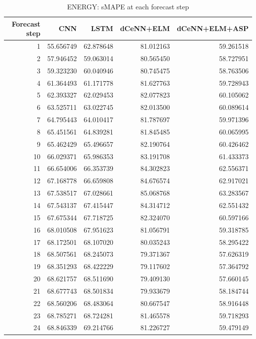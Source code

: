 \begin{table}
\caption{ENERGY: sMAPE at each forecast step}
\begin{tabular}{rrrrr}
\toprule
Forecast step & CNN & LSTM & dCeNN+ELM & dCeNN+ELM+ASP \\
\midrule
1 & 55.656749 & 62.878648 & 81.012163 & 59.261518 \\
2 & 57.946452 & 59.063014 & 80.565450 & 58.727951 \\
3 & 59.323230 & 60.040946 & 80.745475 & 58.763506 \\
4 & 61.364493 & 61.171778 & 81.627763 & 59.728943 \\
5 & 62.393327 & 62.029453 & 82.077823 & 60.105062 \\
6 & 63.525711 & 63.022745 & 82.013500 & 60.089614 \\
7 & 64.795443 & 64.010417 & 81.787697 & 59.971396 \\
8 & 65.451561 & 64.839281 & 81.845485 & 60.065995 \\
9 & 65.462429 & 65.496657 & 82.190764 & 60.426462 \\
10 & 66.029371 & 65.986353 & 83.191708 & 61.433373 \\
11 & 66.654006 & 66.353739 & 84.302823 & 62.556371 \\
12 & 67.168778 & 66.659808 & 84.676574 & 62.917021 \\
13 & 67.538517 & 67.028661 & 85.068768 & 63.283567 \\
14 & 67.543137 & 67.415447 & 84.314712 & 62.551432 \\
15 & 67.675344 & 67.718725 & 82.324070 & 60.597166 \\
16 & 68.010508 & 67.951623 & 81.056791 & 59.318785 \\
17 & 68.172501 & 68.107020 & 80.035243 & 58.295422 \\
18 & 68.507561 & 68.245073 & 79.371367 & 57.626319 \\
19 & 68.351293 & 68.422229 & 79.117602 & 57.364792 \\
20 & 68.621757 & 68.511690 & 79.409130 & 57.660145 \\
21 & 68.677743 & 68.501834 & 79.933679 & 58.184744 \\
22 & 68.560206 & 68.483064 & 80.667547 & 58.916448 \\
23 & 68.785271 & 68.724281 & 81.465578 & 59.718293 \\
24 & 68.846339 & 69.214766 & 81.226727 & 59.479149 \\
\bottomrule
\end{tabular}
\end{table}
